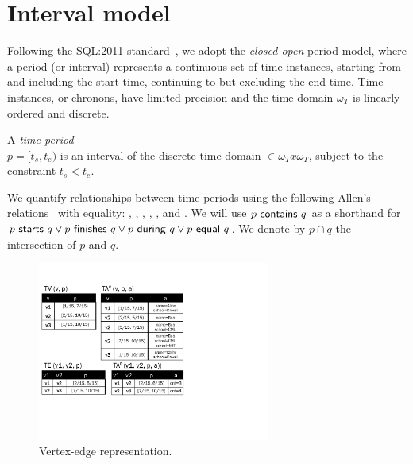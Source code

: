 \section{Interval model}
\label{sec:model}

Following the SQL:2011
standard~\cite{DBLP:journals/sigmod/KulkarniM12}, we adopt the {\em
  closed-open} period model, where a period (or interval) represents a
continuous set of time instances, starting from and including the
start time, continuing to but excluding the end time.  Time instances,
or chronons, have limited precision and the time domain $\omega_T$ is
linearly ordered and discrete.

\vspace{-0.2cm}
\begin{definition}
A {\em time period} \\$p = [t_s, t_e)$ is an interval of the
  discrete time domain $\in \omega_T x \omega_T$, subject to the
  constraint $t_s < t_e$.
\label{def:period} 
\vspace{-0.2cm}
\end{definition}

We quantify relationships between time periods using the following
Allen's relations~\cite{allen83} with equality: ,
, , ,
, and .  We will use
$\pred{p}{contains}{q}$ as a shorthand for $\pred{p}{starts}{q} \vee
\pred{p}{finishes}{q} \vee \pred{p}{during}{q} \vee
\pred{p}{equal}{q}$.  We denote by $p \cap q$ the intersection of $p$
and $q$. \eat{$$to denote $[\predName{max}(p.start,q.start),
    \predName{min}(p.end, q.end))$.}

\begin{figure}
\centering
\includegraphics[width=3in]{figs/T1_rel.pdf}
\vspace{-0.2cm}
\caption{Vertex-edge representation.}
\vspace{-0.3cm}
\label{fig:tg_ve}
\end{figure}

